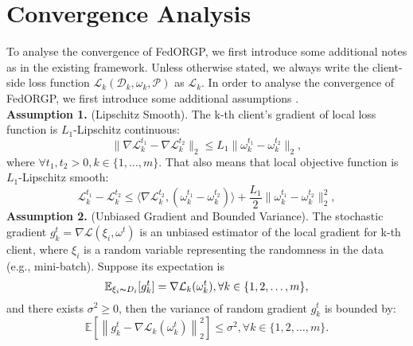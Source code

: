 \section{Convergence Analysis}
\label{sec:convergence analysis}

To analyse the convergence of FedORGP, we first introduce some additional notes as in the existing framework. Unless otherwise stated, we always write the client-side loss function $\mathcal{L}_k(\mathcal{D}_k, \omega_k, \mathcal{P})$ as $\mathcal{L}_k$. In order to analyse the convergence of FedORGP, we first introduce some additional assumptions \cite{tan2022fedproto, yi2023fedgh, FedNH}.\\
\textbf{Assumption 1.} (Lipschitz Smooth). The k-th client's gradient of local loss function is $L_1$-Lipschitz continuous:
\begin{equation}
    \|\nabla\mathcal{L}_k^{t_1}-\nabla\mathcal{L}_k^{t_2}\|_2 
    \leqslant L_1\|\omega_k^{t_1}-\omega_k^{t_2}\|_2, 
    \label{eq:lipschitz-continuous}
\end{equation}
where $\forall t_1, t_2 > 0, k \in \{1, \dots, m\}$. That also means that local objective function is $L_1$-Lipschitz smooth:
\begin{equation}
        \mathcal{L}_k^{t_1} - \mathcal{L}_k^{t_2} \leqslant \langle \nabla \mathcal{L}_k^{t_2}, (\omega_k^{t_1} - \omega_k^{t_2}) \rangle + \frac{L_1}{2} \|\omega_k^{t_1} - \omega_k^{t_2}\|_2^2,
    \label{eq:lipschitz-smooth}
\end{equation}
\textbf{Assumption 2.} (Unbiased Gradient and Bounded Variance). The stochastic gradient $g_{k}^t=\nabla\mathcal{L}(\xi_i, \omega^t)$ is an unbiased estimator of the local gradient for k-th client, where $\xi_i$ is a random variable representing the randomness in the data (e.g., mini-batch). Suppose its expectation is
\begin{equation}
    \mathbb{E}_{\xi_i\thicksim D_i}[g_{k}^t]=\nabla\mathcal{L}_k(\omega_{k}^t),\forall k\in\{1,2,\ldots,m\},
    \label{eq:unbiased gradient}
\end{equation}
and there exists $\sigma^2 \geq 0$, then the variance of random gradient $g_{k}^t$ is bounded by:
\begin{equation}
        \mathbb{E}[\left\|g_{k}^t-\nabla\mathcal{L}_k(\omega_{k}^t)\right\|_2^2]\leqslant\sigma^2,\forall k\in\{1,2,\ldots,m\}.
    \label{eq:bounded variance}
\end{equation}
